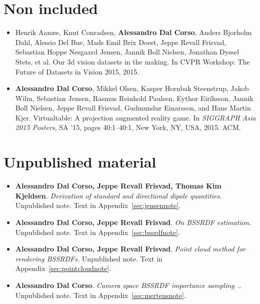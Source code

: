 \section*{Non included}
\begin{itemize}
\item Henrik Aanæs, Knut Conradsen, \textbf{Alessandro Dal Corso}, Anders Bjorholm Dahl, Alessio Del Bue, Mads Emil Brix Doest, Jeppe Revall Frisvad, Sebastian Hoppe Nesgaard Jensen, Jannik Boll Nielsen, Jonathan Dyssel Stets, et al. Our 3d vision datasets in the making. In CVPR Workshop: The Future of Datasets in Vision 2015, 2015.~\cite{aanaes2015our}
\item \textbf{Alessandro Dal Corso}, Mikkel Olsen, Kasper Hornbak Steenstrup, Jakob Wilm, Sebastian Jensen, Rasmus Reinhold Paulsen, Eythor Eiríksson, Jannik Boll Nielsen, Jeppe Revall Frisvad, Gudmundur Einarsson, and Hans Martin Kjer. Virtualtable: A projection augmented reality game. In \textit{SIGGRAPH Asia 2015 Posters}, SA ’15, pages 40:1–40:1, New York, NY, USA, 2015. ACM.~\cite{dalcorsosig15}
\end{itemize}

\section*{Unpublished material}
\begin{itemize}
\item \textbf{Alessandro Dal Corso, Jeppe Revall Frisvad, Thomas Kim Kjeldsen}. \textit{Derivation of standard and directional dipole quantities.} Unpublished note. Text in Appendix~\ref{sec:jensennote}.
\item \textbf{Alessandro Dal Corso, Jeppe Revall Frisvad}. \textit{On BSSRDF estimation.} Unpublished note. Text in Appendix~\ref{sec:bssrdfnote}.
\item \textbf{Alessandro Dal Corso, Jeppe Revall Frisvad}. \textit{Point cloud method for rendering BSSRDFs.} Unpublished note. Text in Appendix~\ref{sec:pointcloudnote}.
\item \textbf{Alessandro Dal Corso}. \textit{Camera space BSSRDF importance sampling
.}. Unpublished note. Text in Appendix~\ref{sec:mertensnote}.
\end{itemize}





